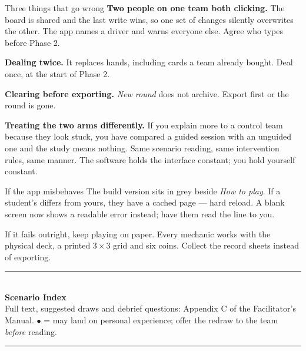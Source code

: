 \documentclass[9pt,letterpaper]{extarticle}
\begin{document}
\vspace{0.2em}
\begin{redbox}{Three things that go wrong}
\textbf{Two people on one team both clicking.} The board is shared and the last
write wins, so one set of changes silently overwrites the other. The app names a
driver and warns everyone else. Agree who types before Phase 2.
\vspace{0.3em}

\textbf{Dealing twice.} It replaces hands, including cards a team already bought.
Deal once, at the start of Phase 2.
\vspace{0.3em}

\textbf{Clearing before exporting.} \emph{New round} does not archive. Export
first or the round is gone.
\vspace{0.3em}

\textbf{Treating the two arms differently.} If you explain more to a control team
because they look stuck, you have compared a guided session with an unguided one
and the study means nothing. Same scenario reading, same intervention rules, same
manner. The software holds the interface constant; you hold yourself constant.
\end{redbox}

\vspace{0.4em}
\begin{greenbox}{If the app misbehaves}
The build version sits in grey beside \emph{How to play}. If a student's differs
from yours, they have a cached page --- hard reload. A blank screen now shows a
readable error instead; have them read the line to you.
\vspace{0.3em}

If it fails outright, keep playing on paper. Every mechanic works with the
physical deck, a printed $3\times3$ grid and six coins. Collect the record sheets
instead of exporting.
\end{greenbox}

\newpage
{\color{deep}\rule{\textwidth}{1.5pt}}\\[0.3em]
{\LARGE\bfseries\color{deep} Scenario Index}\\[0.2em]
{\small Full text, suggested draws and debrief questions: Appendix C of the
Facilitator's Manual. \quad $\bullet$ = may land on personal experience; offer
the redraw to the team \emph{before} reading.}\\[0.2em]
{\color{deep}\rule{\textwidth}{1.5pt}}
\end{document}
